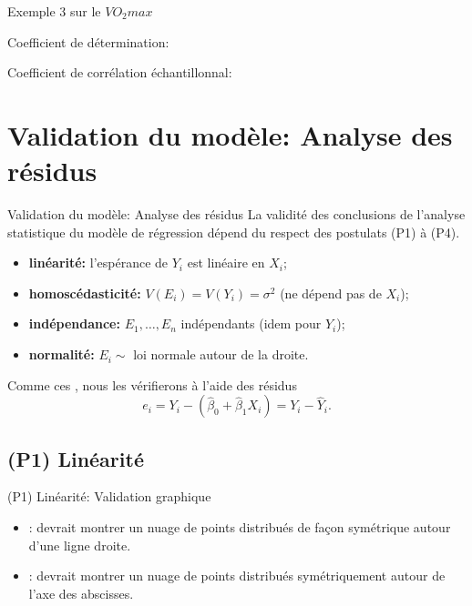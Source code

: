 \documentclass{BeamerTemplate}
\begin{document}
\begin{frame}[t]{Exemple 3 sur le $VO_2max$}

Coefficient de détermination:

\vspace{3cm}

Coefficient de corrélation échantillonnal:
\end{frame}


\section[Valider postulats]{Validation du modèle: Analyse des résidus}


\begin{frame}[t]{Validation du modèle: Analyse des résidus}
La validité des conclusions de l'analyse statistique du modèle de régression
dépend du respect des postulats (P1) à (P4).

\small
\begin{itemize}
\item[P1] {\bf  linéarité:} l'espérance de $Y_i$ est linéaire en $X_i$;
\item[P2] {\bf homoscédasticité:} $V(E_i)=V(Y_i)=\sigma^2$  (ne dépend pas de $X_i$);
\item[P3]  {\bf indépendance:} $E_1,\ldots,E_n$ indépendants (idem pour $Y_i$);
\item[P4]  {\bf  normalité:} $E_i\sim$ loi normale autour de la droite.
\end{itemize}
\normalsize

\medskip
Comme ces , nous les vérifierons à l'aide des résidus
$$
e_i=Y_i-(\hat{\beta}_0+\hat{\beta}_1X_i)=Y_i-\hat{Y}_i.
$$
\end{frame}


\subsection{(P1) Linéarité}

\begin{frame}[t]{(P1) Linéarité: Validation graphique}


\begin{itemize}
\item {}: devrait montrer un nuage de points distribués de façon symétrique autour d'une ligne droite.
\item {}: devrait montrer un nuage de points distribués symétriquement autour de l'axe des abscisses.
\end{itemize}
\end{frame}
\end{document}
